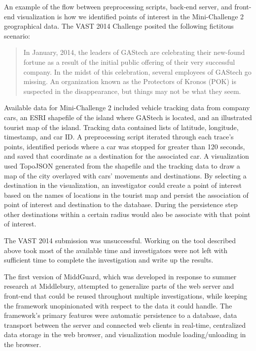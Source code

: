 \documentclass[midd]{thesis}
\begin{document}
An example of the flow between preprocessing scripts, back-end server, and
front-end visualization is how we identified points of interest in the
Mini-Challenge 2 geographical data. The VAST 2014 Challenge \cite{vast2014}
posited the following fictitous scenario:

\begin{quote}

In January, 2014, the leaders of GAStech are celebrating their new-found fortune
as a result of the initial public offering of their very successful company. In
the midst of this celebration, several employees of GAStech go missing. An
organization known as the Protectors of Kronos (POK) is suspected in the
disappearance, but things may not be what they seem.

\end{quote}

Available data for Mini-Challenge 2 included vehicle tracking data from
company cars, an ESRI shapefile of the island where GAStech is located, and an
illustrated tourist map of the island. Tracking data contained lists of
latitude, longitude, timestamp, and car ID. A preprocessing script iterated
through each trace's points, identified periods where a car was stopped for
greater than 120 seconds, and saved that coordinate as a destination for the
associated car. A visualization used TopoJSON \cite{topojson-spec} generated
from the shapefile and the tracking data to draw a map of the city overlayed
with cars' movements and destinations. By selecting a destination in the
visualization, an investigator could create a point of interest based on the
names of locations in the tourist map and persist the association of point of
interest and destination to the database. During the persistence step other
destinations within a certain radius would also be associate with that point of
interest.

The VAST 2014 submission was unsuccessful. Working on the tool described above
took most of the available time and investigators were not left with sufficient
time to complete the investigation and write up the results.

The first version of MiddGuard, which was developed in response to summer
research at Middlebury, attempted to generalize parts of the web server and
front-end that could be reused throughout multiple investigations, while keeping
the framework unopinionated with respect to the data it could handle. The
framework's primary features were automatic persistence to a database, data
transport between the server and connected web clients in real-time, centralized
data storage in the web browser, and visualization module loading/unloading in
the browser.
\end{document}
